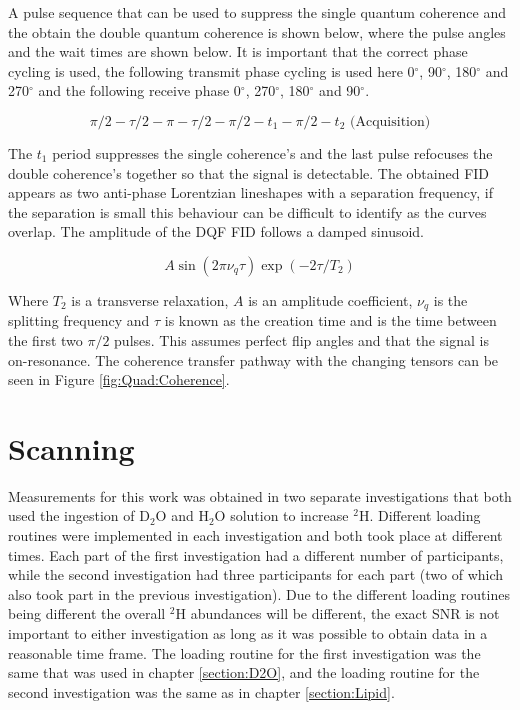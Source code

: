 \documentclass[class=article, crop=false]{standalone}
\begin{document}
A pulse sequence that can be used to suppress the single quantum coherence and the obtain the double quantum coherence is shown below\cite{Sharf1995DetectionNMR-Spectroscopy}, where the pulse angles and the wait times are shown below. It is important that the correct phase cycling is used\cite{Bodenhausen1984SelectionExperiments}, the following transmit phase cycling is used here 0$^\circ$, 90$^\circ$, 180$^\circ$ and 270$^\circ$ and the following receive phase 0$^\circ$, 270$^\circ$, 180$^\circ$ and 90$^\circ$. 

\begin{equation}
    \pi/2-\tau/2-\pi-\tau/2-\pi/2-t_1-\pi/2-t_2 \textrm{ (Acquisition)}
    \label{eqn:Quad:Pulse}
\end{equation}

The $t_1$ period suppresses the single coherence's and the last pulse refocuses the double coherence's together so that the signal is detectable. The obtained FID appears as two anti-phase Lorentzian lineshapes with a separation frequency, if the separation is small this behaviour can be difficult to identify as the curves overlap. The amplitude of the DQF FID follows a damped sinusoid.

\begin{equation}
    A\sin(2\pi\nu_q\tau)\exp(-2\tau/T_2)
    \label{eqn:Quad:Amplitude}
\end{equation}

Where $T_2$ is a transverse relaxation, $A$ is an amplitude coefficient, $\nu_q$ is the splitting frequency and $\tau$ is known as the creation time and is the time between the first two $\pi/2$ pulses. This assumes perfect flip angles and that the signal is on-resonance. The coherence transfer pathway with the changing tensors can be seen in Figure \ref{fig:Quad:Coherence}.


\section{Scanning}

Measurements for this work was obtained in two separate investigations that both used the ingestion of D$_2$O and H$_2$O solution to increase $^2$H. Different loading routines were implemented in each investigation and both took place at different times. Each part of the first investigation had a different number of participants, while the second investigation had three participants for each part (two of which also took part in the previous investigation). Due to the different loading routines being different the overall $^2$H abundances will be different, the exact SNR is not important to either investigation as long as it was possible to obtain data in a reasonable time frame. The loading routine for the first investigation was the same that was used in chapter \ref{section:D2O}, and the loading routine for the second investigation was the same as in chapter \ref{section:Lipid}.
\end{document}
